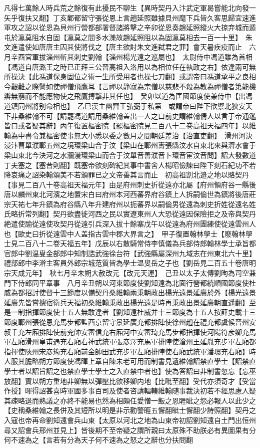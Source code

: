 凡得七萬餘人時兵荒之餘復有此擾民不聊生【異時契丹入汴武定軍曷嘗能北向發一矢乎復扶又翻】丁亥鄴都留守張從恩上言趙延照雖據貝州麾下兵皆久客思歸宜速進軍攻之詔以從恩為貝州行營都部署督諸將擊之辛卯從恩奏趙延照縱火大掠弃城而遁屯於瀛莫阻水自固【瀛莫之間多水濼故趙延照阻以為固瀛莫相去一百一十里】　朱文進遣使如唐唐主囚其使將伐之【唐主欲討朱文進弑君之罪】會天暑疾疫而止　六月辛酉官軍拔淄州斬其刺史劉翰【淄州楊光遠之巡屬也】　太尉侍中馮道雖為首相【馮道自唐潞王之時已正拜三公晉高祖入洛用以為相位任在執政之右】依違兩可無所操決【此馮道保身固位之術一生所受用者也操七刀翻】或謂帝曰馮道承平之良相今艱難之際譬如使禪僧飛鷹耳【言禪以静寂為宗僧以慈悲不殺為教為禪僧者第能機辯無窮而不能應物使之飛鷹搏撃非其任也】　癸卯以道為匡國節度使兼侍中【出馮道鎮同州將别命相也】　乙巳漢主幽齊王弘弼于私第　或謂帝曰陛下欲禦北狄安天下非桑維翰不可【請罷馮道請用桑維翰盖出一人之口前史謂維翰倩人以言于帝通鑑皆曰或者疑其辭】丙午復置樞密院【罷樞密院見二百八十二卷高祖天福四年】以維翰為中書令兼樞密使事無大小悉以委之數月之間朝廷差治【治直吏翻】　滑州河決浸汴曹單濮鄆五州之境環梁山合于汶【梁山在鄆州夀張縣汶水自東北來與濟水會于梁山東北今決河之水瀰漫環梁山而合于汶單音善濮音卜環音宦汶音問】詔大發數道丁夫塞之【塞昔則翻】既塞帝欲刻碑紀其事中書舍人楊昭儉諫曰陛下刻石紀功不若降哀痛之詔染翰頌美不若頒罪已之文帝善其言而止　初高祖割北邉之地以賂契丹【事見二百八十卷高祖天福元年】由是府州刺史折從遠亦北屬【府州領府谷一縣後唐以麟州東北河濱之地置宋白曰府州本河西蕃界府谷鎮上人拆嗣倫世為鎮將後唐莊宗天祐七年升鎮為府谷縣八年升建府州以扼蕃界以嗣倫男從遠為刺史折姓從遠名姓氏略折常列翻】契丹欲盡徙河西之民以實遼東州人大恐從遠因保險拒之及帝與契丹絶遣使諭從遠使攻契丹從遠引兵深入拔十餘寨戊午以從遠為府州團練使從遠雲州人也【歐史曰折從遠雲中人盖指古雲中郡大界言之】　甲子復置翰林學士【廢翰林學士見二百八十二卷天福五年】戊辰以右散騎常侍李慎儀為兵部侍郎翰林學士承旨都官郎中劉温叟金部郎中知制誥武強徐台符【武強縣屬深州九域志在州東北六十里】禮部郎中李澣主客員外郎宗城范質皆為學士温叟岳之子也【劉岳見二百五十卷唐明宗天成元年】　秋七月辛未朔大赦改元【改元天運】　己丑以太子太傅劉昫為司空兼門下侍郎同平章事　八月辛丑朔以河東節度使劉知遠為北面行營都統順國節度使杜威為都招討使督十三節度以備契丹桑維翰兩秉朝政出楊光遠景延廣於外【楊光遠景延廣先皆嘗摠宿衛兵天福初桑維翰秉政出楊光遠是時再秉政出景延廣朝直遥翻】至是一制指揮節度使十五人無敢違者【劉知遠杜威并十三節度為十五人按薛史載十三節度鄆州張從恩充馬步都監西京留守景延廣充都排陣使徐州趙在禮充都虞候晉州安叔千充左廂排陣使前兖帥安審信充右廂河中安審琦充馬步都指揮使河陽符彦卿充馬軍左廂滑州皇甫遇充右廂右神武統軍張彦澤充馬軍排陣使滄州王延胤充步軍左廂都指揮使陜州宋彦筠充右廂前金帥田武充步軍左廂排陣使右廂武統軍潘環充右廂】時人服其膽略朔方節度使馮暉上章自陳未老可用而制書見遺維翰詔禁直學士【詔禁直學士者以詔旨詔之也禁直學士學士之入直禁中者也】使為答詔曰非制書忽忘【忘巫放翻】實以朔方重地非卿無以彈壓比欲移卿内地【比毗至翻】受代亦須奇才【受當作授】暉得詔甚喜時軍國多事百司及使者咨請輻輳維翰随事裁決初若不經思慮人疑其疎略退而熟議之亦終不能易也然為相頗任愛憎一飯之恩睚眦之怨必報人以此少之【史稱桑維翰之長併及其短所以明是非示勸警睚五懈翻眦士懈翻少詩照翻】契丹之入寇也帝再命劉知遠會兵山東【太原以河北之地為山東帝初詔劉知遠自土門出恒州尋又詔會兵邢州並見上】皆後期不至帝疑之謂所親曰太原殊不助朕必有異圖果有分何不速為之【言若有分為天子何不速為之怒之之辭也分扶問翻